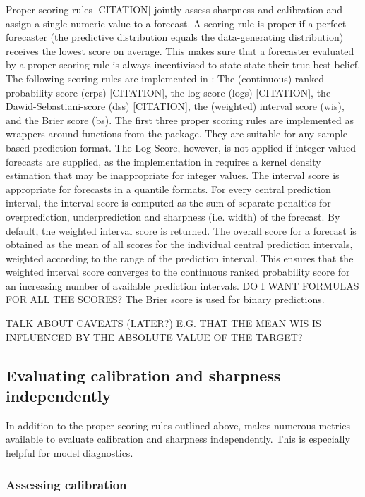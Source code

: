 \documentclass[article]{jss}
\begin{document}
Proper scoring rules [CITATION] jointly assess sharpness and calibration and assign a single numeric value to a forecast. A scoring rule is proper if a perfect forecaster (the predictive distribution equals the data-generating distribution) receives the lowest score on average. This makes sure that a forecaster evaluated by a proper scoring rule is always incentivised to state state their true best belief. The following scoring rules are implemented in : The (continuous) ranked probability score (crps) [CITATION], the log score (logs) [CITATION], the Dawid-Sebastiani-score (dss) [CITATION], the (weighted) interval score (wis), and the Brier score (bs). The first three proper scoring rules are implemented as wrappers around functions from the  package. They are suitable for any sample-based prediction format. The Log Score, however, is not applied if integer-valued forecasts are supplied, as the implementation in  requires a kernel density estimation that may be inappropriate for integer values. The interval score is appropriate for forecasts in a quantile formats. For every central prediction interval, the interval score is computed as the sum of separate penalties for overprediction, underprediction and sharpness (i.e. width) of the forecast. By default, the weighted interval score is returned. The overall score for a forecast is obtained as the mean of all scores for the individual central prediction intervals, weighted according to the range of the prediction interval. This ensures that the weighted interval score converges to the continuous ranked probability score for an increasing number of available prediction intervals. 
DO I WANT FORMULAS FOR ALL THE SCORES? The Brier score is used for binary predictions. 

TALK ABOUT CAVEATS (LATER?) E.G. THAT THE MEAN WIS IS INFLUENCED BY THE ABSOLUTE VALUE OF THE TARGET?

\subsection{Evaluating calibration and sharpness independently}

In addition to the proper scoring rules outlined above,  makes numerous metrics available to evaluate calibration and sharpness independently. This is especially helpful for model diagnostics. 

\subsubsection{Assessing calibration} 
\end{document}
